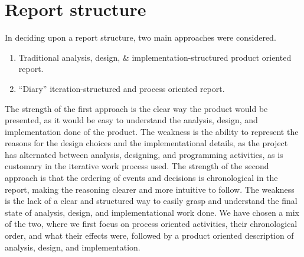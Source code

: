 \chapter{Report structure}
\label{report_structure}

In deciding upon a report structure, two main approaches were considered.

\begin{enumerate}
	\item Traditional analysis, design, \& implementation-structured product oriented report.
	\item ``Diary'' iteration-structured and process oriented report.
\end{enumerate}

The strength of the first approach is the clear way the product would be presented, as it would be easy to understand the analysis, design, and implementation done of the product. 
The weakness is the ability to represent the reasons for the design choices and the implementational details, as the project has alternated between analysis, designing, and programming activities, as is customary in the iterative work process used. \newline
The strength of the second approach is that the ordering of events and decisions is chronological in the report, making the reasoning clearer and more intuitive to follow. 
The weakness is the lack of a clear and structured way to easily grasp and understand the final state of analysis, design, and implementational work done. \newline
We have chosen a mix of the two, where we first focus on process oriented activities, their chronological order, and what their effects were, followed by a product oriented description of analysis, design, and implementation.


